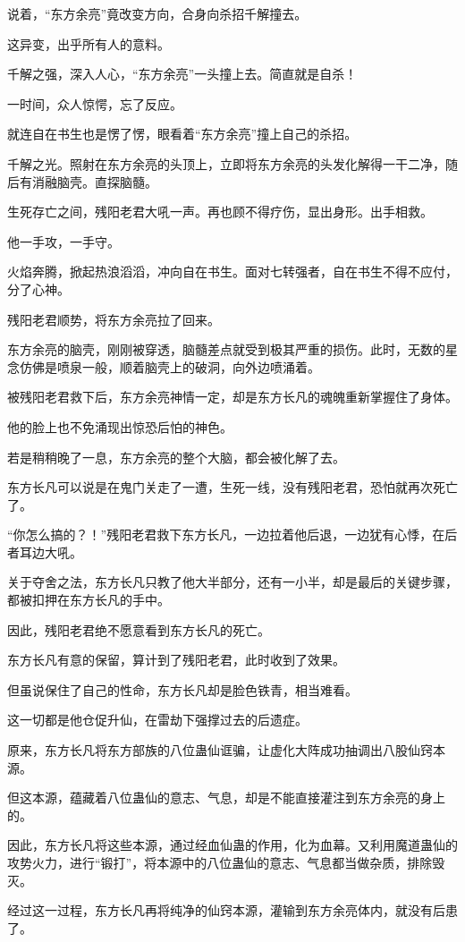 \begin{this_body}
说着，“东方余亮”竟改变方向，合身向杀招千解撞去。

这异变，出乎所有人的意料。

千解之强，深入人心，“东方余亮”一头撞上去。简直就是自杀！

一时间，众人惊愕，忘了反应。

就连自在书生也是愣了愣，眼看着“东方余亮”撞上自己的杀招。

千解之光。照射在东方余亮的头顶上，立即将东方余亮的头发化解得一干二净，随后有消融脑壳。直探脑髓。

生死存亡之间，残阳老君大吼一声。再也顾不得疗伤，显出身形。出手相救。

他一手攻，一手守。

火焰奔腾，掀起热浪滔滔，冲向自在书生。面对七转强者，自在书生不得不应付，分了心神。

残阳老君顺势，将东方余亮拉了回来。

东方余亮的脑壳，刚刚被穿透，脑髓差点就受到极其严重的损伤。此时，无数的星念仿佛是喷泉一般，顺着脑壳上的破洞，向外边喷涌着。

被残阳老君救下后，东方余亮神情一定，却是东方长凡的魂魄重新掌握住了身体。

他的脸上也不免涌现出惊恐后怕的神色。

若是稍稍晚了一息，东方余亮的整个大脑，都会被化解了去。

东方长凡可以说是在鬼门关走了一遭，生死一线，没有残阳老君，恐怕就再次死亡了。

“你怎么搞的？！”残阳老君救下东方长凡，一边拉着他后退，一边犹有心悸，在后者耳边大吼。

关于夺舍之法，东方长凡只教了他大半部分，还有一小半，却是最后的关键步骤，都被扣押在东方长凡的手中。

因此，残阳老君绝不愿意看到东方长凡的死亡。

东方长凡有意的保留，算计到了残阳老君，此时收到了效果。

但虽说保住了自己的性命，东方长凡却是脸色铁青，相当难看。

这一切都是他仓促升仙，在雷劫下强撑过去的后遗症。

原来，东方长凡将东方部族的八位蛊仙诓骗，让虚化大阵成功抽调出八股仙窍本源。

但这本源，蕴藏着八位蛊仙的意志、气息，却是不能直接灌注到东方余亮的身上的。

因此，东方长凡将这些本源，通过经血仙蛊的作用，化为血幕。又利用魔道蛊仙的攻势火力，进行“锻打”，将本源中的八位蛊仙的意志、气息都当做杂质，排除毁灭。

经过这一过程，东方长凡再将纯净的仙窍本源，灌输到东方余亮体内，就没有后患了。


\end{this_body}
